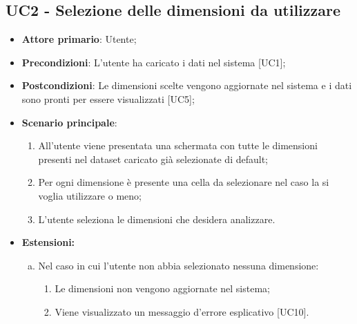 \subsection{UC2 - Selezione delle dimensioni da utilizzare}
\begin{itemize}
	\item \textbf{Attore primario}: Utente;
	\item \textbf{Precondizioni}: L'utente ha caricato i dati nel sistema [UC1];
	\item \textbf{Postcondizioni}: Le dimensioni scelte vengono aggiornate nel sistema e i dati sono pronti per essere visualizzati [UC5];
	\item \textbf{Scenario principale}:
		\begin{enumerate}
			\item All'utente viene presentata una schermata con tutte le dimensioni presenti nel dataset caricato già selezionate di default;
			\item Per ogni dimensione è presente una cella da selezionare nel caso la si voglia utilizzare o meno;
			\item L'utente seleziona le dimensioni che desidera analizzare.
		\end{enumerate}
	\item \textbf{Estensioni:}
		\begin{enumerate}[(a)]
			\item Nel caso in cui l'utente non abbia selezionato nessuna dimensione:
			\begin{enumerate}[1.]
				\item Le dimensioni non vengono aggiornate nel sistema;
				\item Viene visualizzato un messaggio d'errore esplicativo [UC10].
			\end{enumerate}
		\end{enumerate}
\end{itemize}